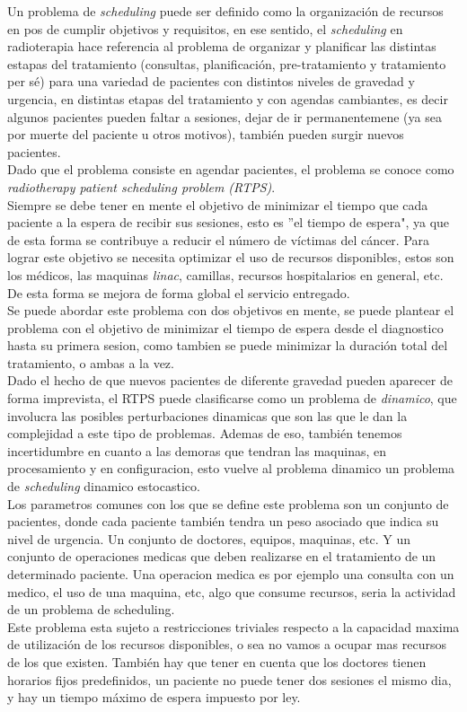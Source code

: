 \documentclass[letter, 10pt]{article}
\begin{document}
Un problema de \emph{scheduling} puede ser definido como la organización de recursos en pos de cumplir objetivos y requisitos\cite{pinedo2016scheduling}, en ese sentido, el \emph{scheduling} en radioterapia hace referencia al problema de organizar y planificar las distintas estapas del tratamiento (consultas, planificación, pre-tratamiento y tratamiento per sé) para una variedad de pacientes con distintos niveles de gravedad y urgencia, en distintas etapas del tratamiento y con agendas cambiantes, es decir algunos pacientes pueden faltar a sesiones, dejar de ir permanentemene (ya sea por muerte del paciente u otros motivos), también pueden surgir nuevos pacientes.
\\Dado que el problema consiste en agendar pacientes, el problema se conoce como \emph{radiotherapy patient scheduling problem (RTPS)}.
\\Siempre se debe tener en mente el objetivo de minimizar el tiempo que cada paciente a la espera de recibir sus sesiones, esto es ''el tiempo de espera", ya que de esta forma se contribuye a reducir el número de víctimas del cáncer. Para lograr este objetivo se necesita optimizar el uso de recursos disponibles, estos son los médicos, las maquinas \emph{linac}, camillas, recursos hospitalarios en general, etc. De esta forma se mejora de forma global el servicio entregado.
\\Se puede abordar este problema con dos objetivos en mente, se puede plantear el problema con el objetivo de minimizar el tiempo de espera desde el diagnostico hasta su primera sesion, como tambien se puede minimizar la duración total del tratamiento, o ambas a la vez.
\\Dado el hecho de que nuevos pacientes de diferente gravedad pueden aparecer de forma imprevista, el RTPS puede clasificarse como un problema de \emph{dinamico}, que involucra las posibles perturbaciones dinamicas que son las que le dan la complejidad a este tipo de problemas. Ademas de eso, también tenemos incertidumbre en cuanto a las demoras que tendran las maquinas, en procesamiento y en configuracion, esto vuelve al problema dinamico un problema de \emph{scheduling} dinamico estocastico\cite{kapamara2006review}.
\\Los parametros comunes con los que se define este problema son un conjunto de pacientes, donde cada paciente también tendra un peso asociado que indica su nivel de urgencia. Un conjunto de doctores, equipos, maquinas, etc. Y un conjunto de operaciones medicas que deben realizarse en el tratamiento de un determinado paciente. Una operacion medica es por ejemplo una consulta con un medico, el uso de una maquina, etc, algo que consume recursos, seria la actividad de un problema de scheduling.
\\Este problema esta sujeto a restricciones triviales respecto a la capacidad maxima de utilización de los recursos disponibles, o sea no vamos a ocupar mas recursos de los que existen. También hay que tener en cuenta que los doctores tienen horarios fijos predefinidos, un paciente no puede tener dos sesiones el mismo dia, y hay un tiempo máximo de espera impuesto por ley.
\end{document}
